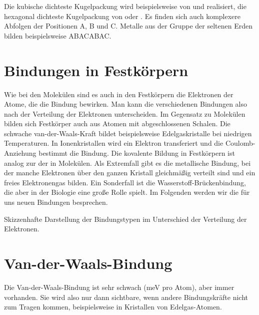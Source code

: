 Die kubische dichteste Kugelpackung wird beispielsweise von  und  realisiert, die hexagonal dichteste Kugelpackung von  oder . Es finden sich auch komplexere Abfolgen der Positionen A, B und C. Metalle aus der Gruppe der seltenen Erden bilden beispielsweise ABACABAC.






\section{Bindungen in Festkörpern}



Wie bei den Molekülen  sind es auch in den Festkörpern die Elektronen der Atome, die die Bindung bewirken. Man kann die verschiedenen Bindungen also nach der Verteilung der Elektronen unterscheiden. Im Gegensatz zu Molekülen bilden sich Festkörper auch aus Atomen mit abgeschlossenen Schalen. Die schwache van-der-Waals-Kraft bildet beispielsweise Edelgaskristalle bei niedrigen Temperaturen. In Ionenkristallen wird ein Elektron transferiert und die Coulomb-Anziehung  bestimmt die Bindung. Die kovalente Bildung in Festkörpern ist analog zur der in Molekülen. Als Extremfall gibt es die metallische Bindung, bei der manche Elektronen über den ganzen Kristall gleichmäßig verteilt sind und  ein freies Elektronengas bilden. Ein Sonderfall ist die Wasserstoff-Brückenbindung, die aber in der Biologie eine große Rolle spielt. Im Folgenden werden wir die für uns neuen  Bindungen besprechen.

\begin{marginfigure}

\caption{Skizzenhafte Darstellung der Bindungstypen im Unterschied der Verteilung der Elektronen.}
\end{marginfigure}



\section{Van-der-Waals-Bindung}

Die Van-der-Waals-Bindung ist sehr schwach (meV pro Atom), aber immer vorhanden. Sie wird also nur dann sichtbare, wenn andere Bindungskräfte nicht zum Tragen kommen, beispielsweise in Kristallen von Edelgas-Atomen.


